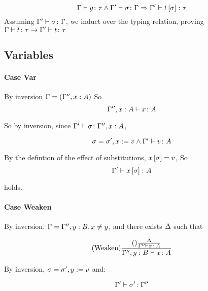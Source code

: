 \documentclass{report}
\begin{document}
\begin{equation}
    \Gamma \vdash g \colon \tau\wedge\Gamma' \vdash \sigma \colon \Gamma\Rightarrow\Gamma' \vdash t\left[\sigma\right] \colon \tau
\end{equation}
Assuming $\Gamma' \vdash \sigma \colon \Gamma$, we induct over the typing relation, proving $\Gamma \vdash t \colon \tau\rightarrow\Gamma' \vdash t \colon \tau$

\subsection{Variables}  
    \paragraph{Case Var}
        By inversion $\Gamma = (\Gamma'', x:A)$
        So \begin{equation}
            \Gamma'',x:A \vdash x \colon A
        \end{equation}

        So by inversion, since $\Gamma' \vdash \sigma \colon \Gamma'', x:A$, 

        \begin{equation}
            \sigma = \sigma', x:= v \wedge \Gamma' \vdash v \colon A
        \end{equation}

        By the defintion of the effect of substitutions, $x\left[\sigma\right] = v$, So
        \begin{equation}
            \Gamma' \vdash x\left[\sigma\right] \colon A
        \end{equation}

        holds.
        
    \paragraph{Case Weaken}
        By inversion, $\Gamma = \Gamma'', y: B, x \neq y$, and there exists $\Delta$ such that

        \begin{equation}
            (\text{Weaken}) \frac{(\text{}) \frac{\Delta}{\Gamma'' \vdash x \colon A}}{\Gamma'', y: B \vdash x \colon A}
        \end{equation}

        By inversion, $\sigma = \sigma', y:= v$
        and:

        \begin{equation}
            \Gamma' \vdash \sigma' \colon \Gamma''
        \end{equation}
\end{document}
